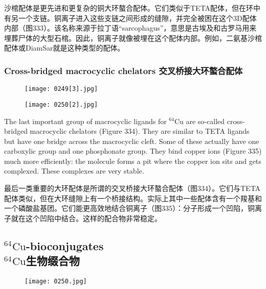 \documentclass[dvipsnames, svgnames,a4paper,11pt]{article}
\begin{document}
沙棺配体是更先进和更复杂的铜大环螯合配体。它们类似于TETA配体，但在环中有另一个支链。铜离子进入这些支链之间形成的缝隙，并完全被困在这个3D配体内部（图333）。该名称来源于拉丁语“sarcophagus”，意思是古埃及和古罗马用来埋葬尸体的大型石棺。因此，铜离子就像被埋在这个配体内部。例如，二氨基沙棺配体或DiamSar就是这种类型的配体。

\subsubsection{Cross-bridged macrocyclic chelators 交叉桥接大环螯合配体}  

\begin{figure}[h]
	\centering
    \texttt{[image: 0249[3].jpg]}  
     \label{fig334}
\end{figure}

\begin{figure}[h]
	\centering
    \texttt{[image: 0250[2].jpg]}  
     \label{fig335}
\end{figure}

The last important group of macrocyclic ligands for \(\mathrm{^{64}Cu}\) are so-called cross-bridged macrocyclic chelators (Figure 334). They are similar to TETA ligands but have one bridge across the macrocyclic cleft. Some of these actually have one carboxylic group and one phosphonate group. They bind copper ions (Figure 335) much more efficiently: the molecule forms a pit where the copper ion sits and gets complexed. These complexes are very stable.

最后一类重要的大环配体是所谓的交叉桥接大环螯合配体（图334）。它们与TETA配体类似，但在大环缝隙上有一个桥接结构。实际上其中一些配体含有一个羧基和一个磷酸盐基团。它们能更高效地结合铜离子（图335）：分子形成一个凹陷，铜离子就在这个凹陷中结合。这样的配合物非常稳定。

\subsection{\(\mathrm{^{64}Cu}\)-bioconjugates\\ \(\mathrm{^{64}Cu}\)生物缀合物}  

\begin{figure}[h]
	\centering
    \texttt{[image: 0250.jpg]}  
     \label{fig336}
\end{figure}
\end{document}
